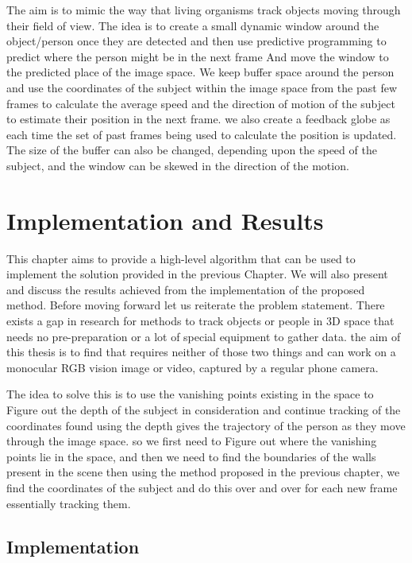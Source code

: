 \documentclass[12pt]{report}
\begin{document}
The aim is to mimic the way that living organisms track objects moving through their field of view. The idea is to create a small dynamic window around the object/person once they are detected and then use predictive programming to predict where the person might be in the next frame And move the window to the predicted place of the image space. We keep buffer space around the person and use the coordinates of the subject within the image space from the past few frames to calculate the average speed and the direction of motion of the subject to estimate their position in the next frame. we also create a feedback globe as each time the set of past frames being used to calculate the position is updated. The size of the buffer can also be changed, depending upon the speed of the subject, and the window can be skewed in the direction of the motion.\newline


\chapter{Implementation and Results}

This chapter aims to provide a high-level algorithm that can be used to implement the solution provided in the previous Chapter. We will also present and discuss the results achieved from the implementation of the proposed method. Before moving forward let us reiterate the problem statement. There exists a gap in research for methods to track objects or people in 3D space that needs no pre-preparation or a lot of special equipment to gather data. the aim of this thesis is to find that requires neither of those two things and can work on a monocular RGB vision image or video, captured by a regular phone camera.\newline

The idea to solve this is to use the vanishing points existing in the space to Figure out the depth of the subject in consideration and continue tracking of the coordinates found using the depth gives the trajectory of the person as they move through the image space. so we first need to Figure out where the vanishing points lie in the space, and then we need to find the boundaries of the walls present in the scene then using the method proposed in the previous chapter, we find the coordinates of the subject and do this over and over for each new frame essentially tracking them.\newline

\section{Implementation}
\end{document}
